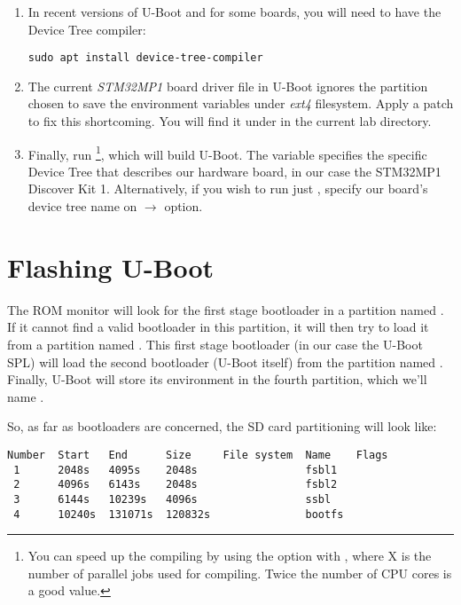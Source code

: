 \begin{enumerate}
\item In recent versions of U-Boot and for some boards, you will
  need to have the Device Tree compiler:

\begin{verbatim}
sudo apt install device-tree-compiler
\end{verbatim}

\item The current {\em STM32MP1} board driver file in U-Boot ignores the partition
chosen to save the environment variables under {\em ext4} filesystem.
Apply a patch to fix this shortcoming.
You will find it under  in the current lab directory.

\item Finally, run \footnote{You can speed up the
    compiling by using the  option with , where X
    is the number of parallel jobs used for compiling. Twice the
    number of CPU cores is a good value.}, which will build
  U-Boot. The  variable specifies the specific
  Device Tree that describes our hardware board, in our case the
  STM32MP1 Discover Kit 1. Alternatively, if you wish to run just ,
  specify our board's device tree name on
   $\rightarrow$ 
  option.
\end{enumerate}

\section{Flashing U-Boot}

The ROM monitor will look for the first stage bootloader in a
partition named . If it cannot find a valid bootloader in
this partition, it will then try to load it from a partition named
. This first stage bootloader (in our case the U-Boot SPL)
will load the second bootloader (U-Boot itself) from the partition
named . Finally, U-Boot will store its environment in the
fourth partition, which we'll name .

So, as far as bootloaders are concerned, the SD card partitioning will
look like:

\begin{verbatim}
Number  Start   End      Size     File system  Name    Flags
 1      2048s   4095s    2048s                 fsbl1
 2      4096s   6143s    2048s                 fsbl2
 3      6144s   10239s   4096s                 ssbl
 4      10240s  131071s  120832s               bootfs
\end{verbatim}


